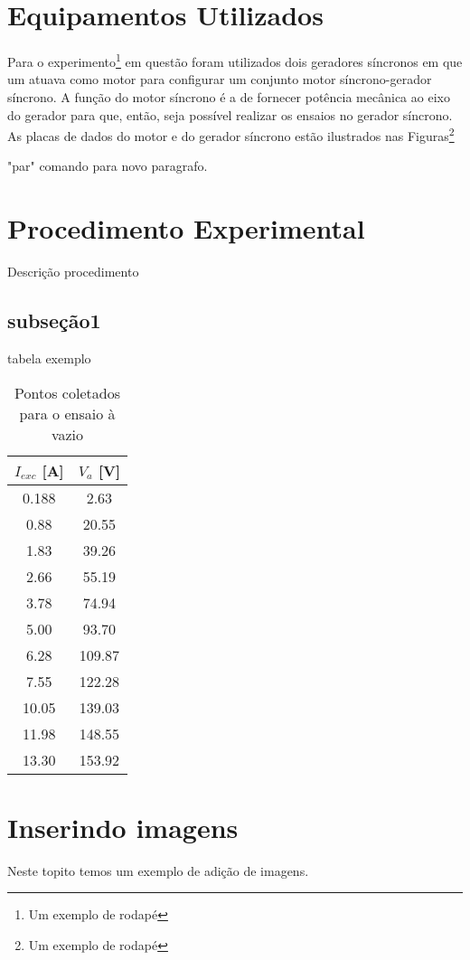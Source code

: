 \documentclass[a4paper, 12pt]{article}
\begin{document}
\section{Equipamentos Utilizados}

Para o experimento\footnote{Um exemplo de rodapé} em questão foram utilizados dois geradores síncronos em que um atuava como motor para configurar um conjunto motor síncrono-gerador síncrono. A função do motor síncrono é a de fornecer potência mecânica ao eixo do gerador para que, então, seja possível realizar os ensaios no gerador síncrono. As placas de dados do motor e do gerador síncrono estão ilustrados nas Figuras\footnote{Um exemplo de rodapé}
\par "par" comando para novo paragrafo.


\section{Procedimento Experimental}

Descrição procedimento


\subsection{subseção1}
tabela exemplo

\begin{table}[htb]
\centering
\begin{tabular}{c|c}
$I_{exc}$ [A] & $V_{a}$ [V] \\ \hline
0.188	& 2.63 		\\\hline
0.88 & 20.55	\\\hline
1.83 & 39.26 \\\hline
2.66 & 55.19 \\\hline
3.78 & 74.94 \\\hline
5.00 & 93.70 \\\hline
6.28 & 109.87 \\\hline
7.55 & 122.28 \\\hline
10.05 & 139.03 \\\hline
11.98 & 148.55 \\\hline
13.30 & 153.92

\end{tabular}
\caption{Pontos coletados para o ensaio à vazio}
\label{PTO:col_vazio}
\end{table}

\section{Inserindo imagens}
Neste topito temos um exemplo de adição de imagens.
\end{document}
